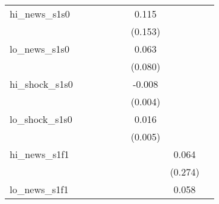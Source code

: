 {\begin{tabular}{l*{8}{c}}
\addlinespace
hi\_news\_s1s0&                     &                     &                     &                     &                     &       0.115         &                     &                     \\
            &                     &                     &                     &                     &                     &     (0.153)         &                     &                     \\
\addlinespace
lo\_news\_s1s0&                     &                     &                     &                     &                     &       0.063         &                     &                     \\
            &                     &                     &                     &                     &                     &     (0.080)         &                     &                     \\
\addlinespace
hi\_shock\_s1s0&                     &                     &                     &                     &                     &      -0.008\sym{*}  &                     &                     \\
            &                     &                     &                     &                     &                     &     (0.004)         &                     &                     \\
\addlinespace
lo\_shock\_s1s0&                     &                     &                     &                     &                     &       0.016\sym{***}&                     &                     \\
            &                     &                     &                     &                     &                     &     (0.005)         &                     &                     \\
\addlinespace
hi\_news\_s1f1&                     &                     &                     &                     &                     &                     &       0.064         &                     \\
            &                     &                     &                     &                     &                     &                     &     (0.274)         &                     \\
\addlinespace
lo\_news\_s1f1&                     &                     &                     &                     &                     &                     &       0.058         &                     \\

\end{tabular}}
